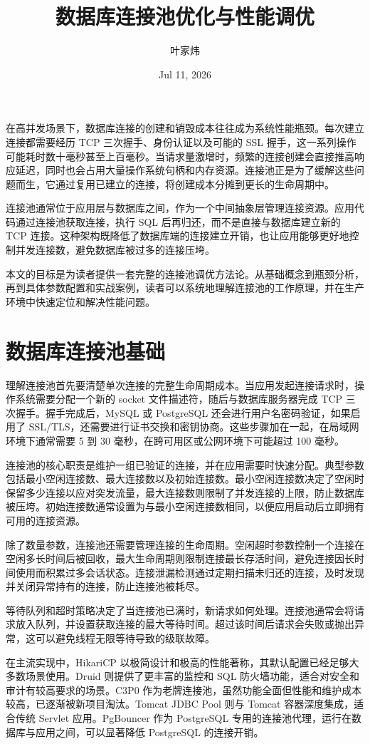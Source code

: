 \title{数据库连接池优化与性能调优}
\author{叶家炜}
\date{Jul 11, 2026}
\maketitle
在高并发场景下，数据库连接的创建和销毁成本往往成为系统性能瓶颈。每次建立连接都需要经历 TCP 三次握手、身份认证以及可能的 SSL 握手，这一系列操作可能耗时数十毫秒甚至上百毫秒。当请求量激增时，频繁的连接创建会直接推高响应延迟，同时也会占用大量操作系统句柄和内存资源。连接池正是为了缓解这些问题而生，它通过复用已建立的连接，将创建成本分摊到更长的生命周期中。\par
连接池通常位于应用层与数据库之间，作为一个中间抽象层管理连接资源。应用代码通过连接池获取连接，执行 SQL 后再归还，而不是直接与数据库建立新的 TCP 连接。这种架构既降低了数据库端的连接建立开销，也让应用能够更好地控制并发连接数，避免数据库被过多的连接压垮。\par
本文的目标是为读者提供一套完整的连接池调优方法论。从基础概念到瓶颈分析，再到具体参数配置和实战案例，读者可以系统地理解连接池的工作原理，并在生产环境中快速定位和解决性能问题。\par
\chapter{数据库连接池基础}
理解连接池首先要清楚单次连接的完整生命周期成本。当应用发起连接请求时，操作系统需要分配一个新的 socket 文件描述符，随后与数据库服务器完成 TCP 三次握手。握手完成后，MySQL 或 PostgreSQL 还会进行用户名密码验证，如果启用了 SSL/TLS，还需要进行证书交换和密钥协商。这些步骤加在一起，在局域网环境下通常需要 5 到 30 毫秒，在跨可用区或公网环境下可能超过 100 毫秒。\par
连接池的核心职责是维护一组已验证的连接，并在应用需要时快速分配。典型参数包括最小空闲连接数、最大连接数以及初始连接数。最小空闲连接数决定了空闲时保留多少连接以应对突发流量，最大连接数则限制了并发连接的上限，防止数据库被压垮。初始连接数通常设置为与最小空闲连接数相同，以便应用启动后立即拥有可用的连接资源。\par
除了数量参数，连接池还需要管理连接的生命周期。空闲超时参数控制一个连接在空闲多长时间后被回收，最大生命周期则限制连接最长存活时间，避免连接因长时间使用而积累过多会话状态。连接泄漏检测通过定期扫描未归还的连接，及时发现并关闭异常持有的连接，防止连接池被耗尽。\par
等待队列和超时策略决定了当连接池已满时，新请求如何处理。连接池通常会将请求放入队列，并设置获取连接的最大等待时间。超过该时间后请求会失败或抛出异常，这可以避免线程无限等待导致的级联故障。\par
在主流实现中，HikariCP 以极简设计和极高的性能著称，其默认配置已经足够大多数场景使用。Druid 则提供了更丰富的监控和 SQL 防火墙功能，适合对安全和审计有较高要求的场景。C3P0 作为老牌连接池，虽然功能全面但性能和维护成本较高，已逐渐被新项目淘汰。Tomcat JDBC Pool 则与 Tomcat 容器深度集成，适合传统 Servlet 应用。PgBouncer 作为 PostgreSQL 专用的连接池代理，运行在数据库与应用之间，可以显著降低 PostgreSQL 的连接开销。\par
